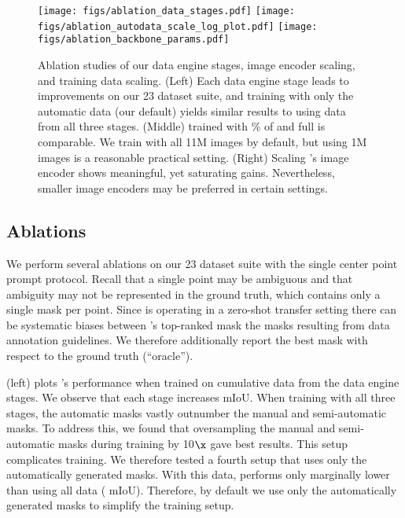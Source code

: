 \begin{figure*}[t]\centering
\texttt{[image: figs/ablation\_data\_stages.pdf]}\hfill
\texttt{[image: figs/ablation\_autodata\_scale\_log\_plot.pdf]}\hfill
\texttt{[image: figs/ablation\_backbone\_params.pdf]}\vspace{-2mm}
\caption{Ablation studies of our data engine stages, image encoder scaling, and training data scaling. (Left) Each data engine stage leads to improvements on our 23 dataset suite, and training with only the automatic data (our default) yields similar results to using data from all three stages. (Middle) \sam trained with \% of \sad and full \sad is comparable. We train with all 11M images by default, but using 1M images is a reasonable practical setting. (Right) Scaling \sam's image encoder shows meaningful, yet saturating gains. Nevertheless, smaller image encoders may be preferred in certain settings.}
\label{fig:ablations}\vspace{-3mm}
\end{figure*}

\subsection{Ablations}\label{sec:eval:ablations}\vspace{-1mm}

We perform several ablations on our 23 dataset suite with the single center point prompt protocol. Recall that a single point may be ambiguous and that ambiguity may not be represented in the ground truth, which contains only a single mask per point. Since \sam is operating in a zero-shot transfer setting there can be systematic biases between \sam's top-ranked mask \vs the masks resulting from data annotation guidelines. We therefore additionally report the best mask with respect to the ground truth (``oracle'').

 (left) plots \sam's performance when trained on cumulative data from the data engine stages. We observe that each stage increases mIoU. When training with all three stages, the automatic masks vastly outnumber the manual and semi-automatic masks. To address this, we found that oversampling the manual and semi-automatic masks during training by 10$\x$ gave best results. This setup complicates training. We therefore tested a fourth setup that uses only the automatically generated masks. With this data, \sam performs only marginally lower than using all data ( mIoU). Therefore, by default we use only the automatically generated masks to simplify the training setup.

